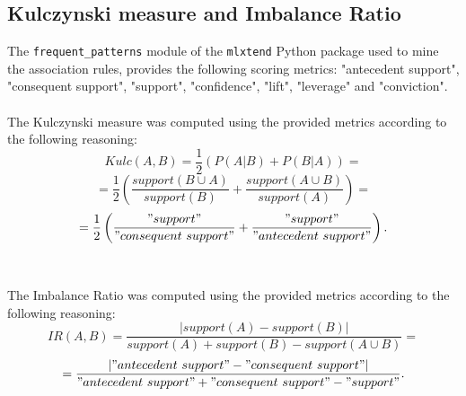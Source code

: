 \documentclass[11pt,a4paper]{article}
\begin{document}
\subsection{Kulczynski measure and Imbalance Ratio}
The \texttt{frequent\_patterns} module of the \texttt{mlxtend} Python package
used to mine the association rules, provides the following scoring metrics:
"antecedent support", "consequent support", "support", "confidence", "lift",
"leverage" and "conviction".\\
\\
The Kulczynski measure was computed using the provided metrics according to the
following reasoning:
$$
    Kulc(A, B) = \frac{1}{2}\left(P(A|B) + P(B|A)\right) =
$$
\vspace*{0.1cm}
$$
    = \frac{1}{2}\left(\frac{support(B \cup A)}{support(B)} +
    \frac{support(A \cup B)}{support(A)}\right) =
$$
\vspace*{0.1cm}
$$
    = \frac{1}{2}\left(\frac{"support"}{"consequent\ support"} +
    \frac{"support"}{"antecedent\ support"}\right).
$$
\\
\\
The Imbalance Ratio was computed using the provided metrics according to the
following reasoning:
$$
    IR(A, B) = \frac{|support(A) - support(B)|}{support(A) + support(B)
    - support(A \cup B)} =
$$
\vspace*{0.1cm}
$$
    = \frac{|"antecedent\ support" - "consequent\ support"|}
    {"antecedent\ support" + "consequent\ support" - "support"}.
$$
\newpage
\printbibliography
\end{document}
